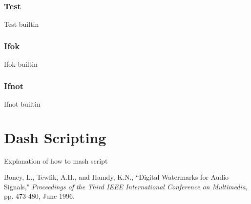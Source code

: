 \documentclass[12pt,a4paper]{report}
\begin{document}
\section{Test}
Test builtin
\section{Ifok}
Ifok builtin
\section{Ifnot}
Ifnot builtin
\part{Dash Scripting}
Explanation of how to mash script
\begin{thebibliography}{100} %
	 Boney, L., Tewfik, A.H., and Hamdy, K.N., ``Digital
	Watermarks for Audio Signals," \emph{Proceedings of the Third IEEE
		International Conference on Multimedia}, pp. 473-480, June 1996.
\end{thebibliography}
\end{document}
